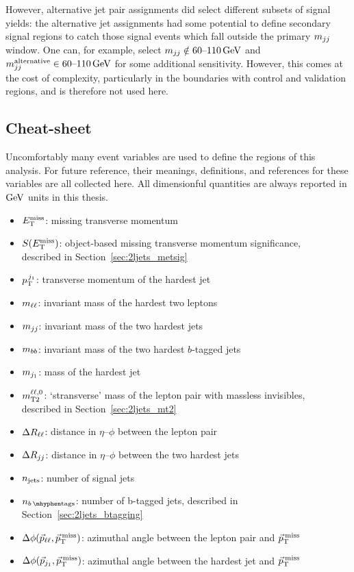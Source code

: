 However, alternative jet pair assignments did select different subsets of
signal yields:
the alternative jet assignments had some potential to define secondary signal
regions to catch those signal events which fall outside the primary
$\mjj$ window.
One can, for example, select $\mjj \notin 60\textrm{--}110\,\eV[G]$ and
$\mjj^\mathrm{alternative} \in 60\textrm{--}110\,\eV[G]$ for some additional
sensitivity.
However, this comes at the cost of complexity, particularly in the boundaries
with control and validation regions, and is therefore not used here.


\subsection{Cheat-sheet}
\label{sec:2ljets_cheatsheet}
Uncomfortably many event variables are used to define the regions of this
analysis.
For future reference, their meanings, definitions, and references for these
variables are all collected here.
All dimensionful quantities are always reported in $\eV[G]$ units in this
thesis.
\begin{itemize}
\item $\met$: missing transverse momentum
\item $\metsig$: object-based missing transverse momentum significance,\\
described in Section~\ref{sec:2ljets_metsig}
\item $\ptjone$: transverse momentum of the hardest jet%
\vspace{0.5em}
\item $\mll$: invariant mass of the hardest two leptons
\item $\mjj$: invariant mass of the two hardest jets
\item $\mbb$: invariant mass of the two hardest $b$-tagged jets
\item $\mjetone$: mass of the hardest jet
\item $\mttwoll$: `stransverse' mass of the lepton pair with massless
invisibles,\\
described in Section~\ref{sec:2ljets_mt2}
\vspace{0.5em}
\item $\rll$: distance in $\eta\textrm{--}\phi$ between the lepton pair
\item $\rjj$: distance in $\eta\textrm{--}\phi$ between the two hardest jets%
\vspace{0.5em}
\item $\njet$: number of signal jets
\item $\nbtag$: number of b-tagged jets,
described in Section~\ref{sec:2ljets_btagging}
\vspace{0.5em}
\item $\dphillmet$: azimuthal angle between the lepton pair and $\ptmiss$
\item $\dphijmet$: azimuthal angle between the hardest jet and $\ptmiss$
\end{itemize}
